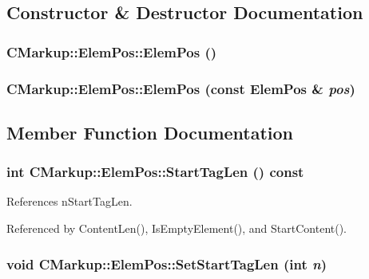 \subsection{Constructor \& Destructor Documentation}
\subsubsection[ElemPos]{\setlength{\rightskip}{0pt plus 5cm}CMarkup::ElemPos::ElemPos ()\hspace{0.3cm}{\tt  [inline]}}\label{structCMarkup_1_1ElemPos_7ba7e4930d77275e80e38ea151b2807b}


\subsubsection[ElemPos]{\setlength{\rightskip}{0pt plus 5cm}CMarkup::ElemPos::ElemPos (const {\bf ElemPos} \& {\em pos})\hspace{0.3cm}{\tt  [inline]}}\label{structCMarkup_1_1ElemPos_739a02a2c992cde556999155bee37e21}




\subsection{Member Function Documentation}
\subsubsection[StartTagLen]{\setlength{\rightskip}{0pt plus 5cm}int CMarkup::ElemPos::StartTagLen () const\hspace{0.3cm}{\tt  [inline]}}\label{structCMarkup_1_1ElemPos_987926f5677976e6288e5b4c3a224d96}




References nStartTagLen.

Referenced by ContentLen(), IsEmptyElement(), and StartContent().
\subsubsection[SetStartTagLen]{\setlength{\rightskip}{0pt plus 5cm}void CMarkup::ElemPos::SetStartTagLen (int {\em n})\hspace{0.3cm}{\tt  [inline]}}\label{structCMarkup_1_1ElemPos_6f366b2f636e221db004bf44fd952912}




